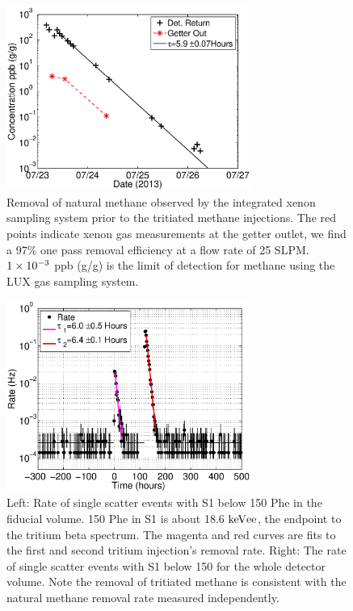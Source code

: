 
\begin{figure}[h!]\centering
\includegraphics[width=80mm]{CH4_injection_3.eps}
\caption{Removal of natural methane observed by the integrated xenon sampling system prior to the tritiated methane injections. The red points indicate xenon gas measurements at the getter outlet, we find a 97\% one pass removal efficiency at a flow rate of 25 SLPM. $\rm 1\times10^{-3}$ ppb (g/g) is the limit of detection for methane using the LUX gas sampling system.}
\label{fig:Removal_methane}
\end{figure}


\begin{figure}[h!]\centering
\includegraphics[width=80mm]{CH3T_Rate_fid_150_Run03_Tritium_Rate.eps}
\caption{Left: Rate of single scatter events with S1 below 150 Phe in the fiducial volume. 150 Phe in S1 is about 18.6 $\rm keV{ee}$, the endpoint to the tritium beta spectrum. The magenta and red curves are fits to the first and second tritium injection's removal rate. Right: The rate of single scatter events with S1 below 150 for the whole detector volume. Note the removal of tritiated methane is consistent with the natural methane removal rate measured independently.}
\label{fig:Removal}
\end{figure}


